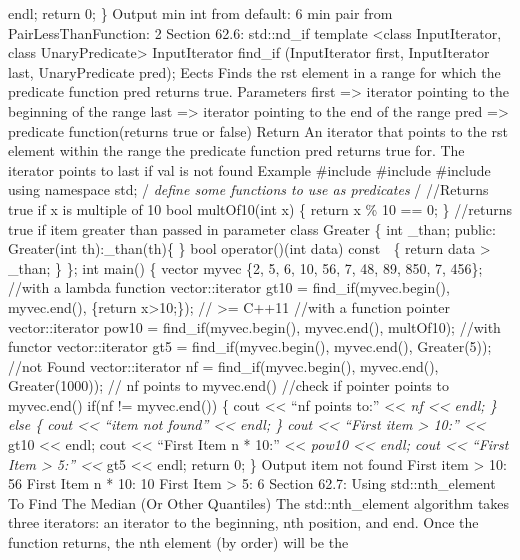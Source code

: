endl; return 0; \} Output min int from default: 6 min pair from
PairLessThanFunction: 2 Section 62.6: std::nd\_if template
\textless class InputIterator, class UnaryPredicate\textgreater{}
InputIterator find\_if (InputIterator first, InputIterator last,
UnaryPredicate pred); Eects Finds the rst element in a range for which
the predicate function pred returns true. Parameters first
=\textgreater{} iterator pointing to the beginning of the range last
=\textgreater{} iterator pointing to the end of the range pred
=\textgreater{} predicate function(returns true or false) Return An
iterator that points to the rst element within the range the predicate
function pred returns true for. The iterator points to last if val is
not found Example \#include \#include \#include using namespace std;
/\emph{ define some functions to use as predicates }/ //Returns true if
x is multiple of 10 bool multOf10(int x) \{ return x \% 10 == 0; \}
//returns true if item greater than passed in parameter class Greater \{
int \_than; public: Greater(int th):\_than(th)\{ \} bool operator()(int
data) const  \{ return data \textgreater{} \_than; \} \}; int main() \{
vector myvec \{2, 5, 6, 10, 56, 7, 48, 89, 850, 7, 456\}; //with a
lambda function vector::iterator gt10 = find\_if(myvec.begin(),
myvec.end(), \href{int\%20x}{}\{return x\textgreater10;\}); //
\textgreater= C++11 //with a function pointer vector::iterator pow10 =
find\_if(myvec.begin(), myvec.end(), multOf10); //with functor
vector::iterator gt5 = find\_if(myvec.begin(), myvec.end(), Greater(5));
//not Found vector::iterator nf = find\_if(myvec.begin(), myvec.end(),
Greater(1000)); // nf points to myvec.end() //check if pointer points to
myvec.end() if(nf != myvec.end()) \{ cout \textless\textless{} ``nf
points to:'' \textless\textless{} \emph{nf \textless\textless{} endl; \}
else \{ cout \textless\textless{} ``item not found''
\textless\textless{} endl; \} cout \textless\textless{} ``First item
\textgreater{} 10:'' \textless\textless{} }gt10 \textless\textless{}
endl; cout \textless\textless{} ``First Item n * 10:''
\textless\textless{} \emph{pow10 \textless\textless{} endl; cout
\textless\textless{} ``First Item \textgreater{} 5:''
\textless\textless{} }gt5 \textless\textless{} endl; return 0; \} Output
item not found First item \textgreater{} 10: 56 First Item n * 10: 10
First Item \textgreater{} 5: 6 Section 62.7: Using std::nth\_element To
Find The Median (Or Other Quantiles) The std::nth\_element algorithm
takes three iterators: an iterator to the beginning, nth position, and
end. Once the function returns, the nth element (by order) will be the
